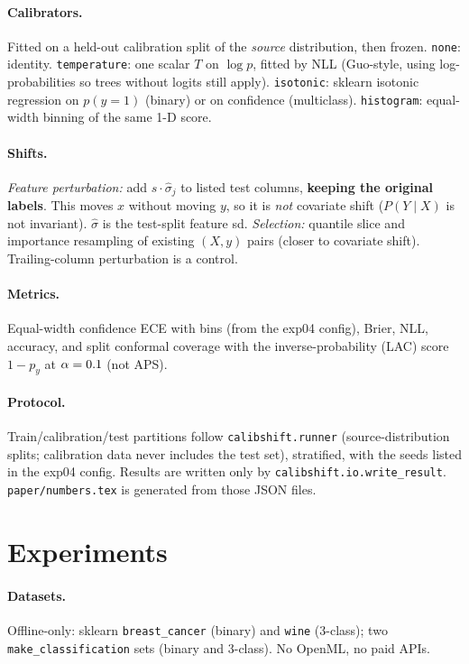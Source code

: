 \documentclass[10pt,twocolumn]{article}
\begin{document}
\paragraph{Calibrators.}
Fitted on a held-out calibration split of the \emph{source} distribution,
then frozen. \texttt{none}: identity. \texttt{temperature}: one scalar
$T$ on $\log p$, fitted by NLL (Guo-style, using log-probabilities so
trees without logits still apply). \texttt{isotonic}: sklearn isotonic
regression on $p(y{=}1)$ (binary) or on confidence (multiclass).
\texttt{histogram}: equal-width binning of the same 1-D score.

\paragraph{Shifts.}
\textit{Feature perturbation:} add $s\cdot\hat\sigma_j$ to listed test
columns, \textbf{keeping the original labels}. This moves $x$ without
moving $y$, so it is \emph{not} covariate shift ($P(Y\mid X)$ is not
invariant). $\hat\sigma$ is the test-split feature sd.
\textit{Selection:} quantile slice and importance resampling of existing
$(X,y)$ pairs (closer to covariate shift). Trailing-column perturbation
is a control.

\paragraph{Metrics.}
Equal-width confidence ECE with \NumEceBins{} bins (from the exp04
config), Brier, NLL, accuracy, and split conformal coverage with the
inverse-probability (LAC) score $1-p_y$ at $\alpha=0.1$
(not APS).

\paragraph{Protocol.}
Train/calibration/test partitions follow \texttt{calibshift.runner}
(source-distribution splits; calibration data never includes the test
set), stratified, with the \NumNSeeds{} seeds listed in the exp04 config.
Results are written only by \texttt{calibshift.io.write\_result}.
\texttt{paper/numbers.tex} is generated from those JSON files.

\section{Experiments}
\paragraph{Datasets.}
Offline-only: sklearn \texttt{breast\_cancer} (binary) and \texttt{wine}
(3-class); two \texttt{make\_classification} sets (binary and 3-class).
No OpenML, no paid APIs.
\end{document}
